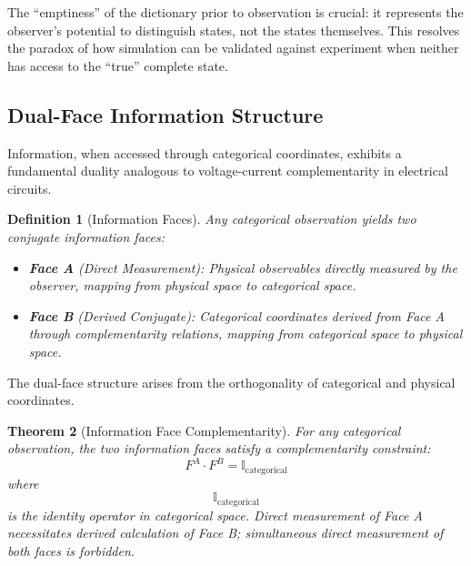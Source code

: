 \documentclass[11pt,twocolumn,a4paper]{article}
\newtheorem{theorem}{Theorem}[section]
\newtheorem{definition}[theorem]{Definition}
\theoremstyle{remark}
\begin{document}
The ``emptiness'' of the dictionary prior to observation is crucial: it represents the observer's potential to distinguish states, not the states themselves. This resolves the paradox of how simulation can be validated against experiment when neither has access to the ``true'' complete state.



\subsection{Dual-Face Information Structure}

Information, when accessed through categorical coordinates, exhibits a fundamental duality analogous to voltage-current complementarity in electrical circuits.

\begin{definition}[Information Faces]
\label{def:information_faces}
Any categorical observation yields two conjugate information faces:
\begin{itemize}
\item \textbf{Face A} (Direct Measurement): Physical observables directly measured by the observer, mapping from physical space to categorical space.
\item \textbf{Face B} (Derived Conjugate): Categorical coordinates derived from Face A through complementarity relations, mapping from categorical space to physical space.
\end{itemize}
\end{definition}

The dual-face structure arises from the orthogonality of categorical and physical coordinates.

\begin{theorem}[Information Face Complementarity]
\label{thm:face_complementarity}
For any categorical observation, the two information faces satisfy a complementarity constraint:
$$
F^A \cdot F^B = \mathbb{I}_{\mathrm{categorical}}
$$
where $$\mathbb{I}_{\mathrm{categorical}}$$ is the identity operator in categorical space. Direct measurement of Face A necessitates derived calculation of Face B; simultaneous direct measurement of both faces is forbidden.
\end{theorem}
\end{document}
